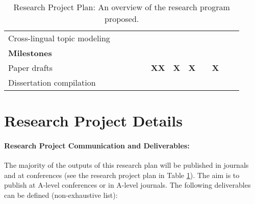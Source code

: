 \begin{table}
{\begin{tabular}{l|llclllcllll}
Cross-lingual topic modeling          &                                        &                                        &                                        &                                        &                                        &                                        &                                       & {\cellcolor[rgb]{0.204,1,0.204}}       & {\cellcolor[rgb]{0.204,1,0.204}}       & {\cellcolor[rgb]{0.204,1,0.204}}       &                               \\
\textbf{Milestones}                   &                                        &                                        &                                        &                                        &                                        &                                        &                                       &                                        &                                        &                                        &                               \\
Paper drafts                          &                                        & \multicolumn{1}{c}{}                   & \textbf{}                              & \multicolumn{1}{c}{}                   & \multicolumn{1}{c}{\textbf{XX}}        & \multicolumn{1}{c}{\textbf{X}}         & \textbf{X}                            & \multicolumn{1}{c}{\textbf{} }         & \multicolumn{1}{c}{\textbf{X} }        & \multicolumn{1}{c}{\textbf{} }         & \multicolumn{1}{c|}{}         \\
Dissertation compilation              &                                        &                                        &                                        &                                        &                                        &                                        &                                       &                                        &                                        & {\cellcolor[rgb]{0.996,0,0}}           & {\cellcolor[rgb]{0.996,0,0}}  \\
\cline{2-12}
\end{tabular}%
}
\caption{Research Project Plan: An overview of the research program proposed.}
\label{researchplan}
\end{table}

\section{Research Project Details}

\paragraph{Research Project Communication and Deliverables:}
The majority of the outputs of this research plan will be published in journals and at conferences (see the research project plan in Table \ref{researchplan}). The aim is to publish at A-level conferences or in A-level journals. The following deliverables can be defined (non-exhaustive list):

